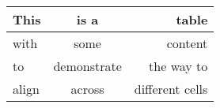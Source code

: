 \begin{longtable}[]{@{}lcr@{}}
\toprule
This & is a & table\tabularnewline
\midrule
\endhead
with & some & content\tabularnewline
to & demonstrate & the way to\tabularnewline
align & across & different cells\tabularnewline
\bottomrule
\end{longtable}
